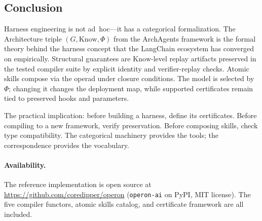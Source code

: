\subsection{Conclusion}

Harness engineering is not ad~hoc---it has a categorical formalization. The Architecture triple $(G, \mathrm{Know}, \Phi)$ from the ArchAgents framework is the formal theory behind the harness concept that the LangChain ecosystem has converged on empirically. Structural guarantees are $\mathrm{Know}$-level replay artifacts preserved in the tested compiler suite by explicit identity and verifier-replay checks. Atomic skills compose via the operad under closure conditions. The model is selected by $\Phi$; changing it changes the deployment map, while supported certificates remain tied to preserved hooks and parameters.

The practical implication: before building a harness, define its certificates. Before compiling to a new framework, verify preservation. Before composing skills, check type compatibility. The categorical machinery provides the tools; the correspondence provides the vocabulary.

\paragraph{Availability.} The reference implementation is open source at \url{https://github.com/coredipper/operon} (\texttt{operon-ai} on PyPI, MIT license). The five compiler functors, atomic skills catalog, and certificate framework are all included.
